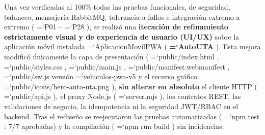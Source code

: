 \documentclass[11pt,a4paper]{article}
\renewcommand{\_}{\oldunderscore\allowbreak}
\DeclareRobustCommand{\texttt}[1]{%
  {\upshape\ttfamily\fontsize{9}{10.8}\selectfont\hyphenchar\font=`\-\relax #1}%
}
\begin{document}
\noindent Una vez verificadas al 100\% todas las pruebas funcionales, de seguridad, balanceo, mensajería RabbitMQ, tolerancia a fallos e integración extremo a extremo (\texttt{P01}--\texttt{P28}), se realizó una \textbf{iteración de refinamiento estrictamente visual y de experiencia de usuario (UI/UX)} sobre la aplicación móvil instalada \texttt{AplicacionMovilPWA} (\textbf{\texttt{AutoUTA}}). Esta mejora modificó únicamente la capa de presentación (\texttt{public/\allowbreak{}index.\allowbreak{}html}, \texttt{public/\allowbreak{}styles.\allowbreak{}css}, \texttt{public/\allowbreak{}main.\allowbreak{}js}, \texttt{public/\allowbreak{}manifest.\allowbreak{}webmanifest}, \texttt{public/\allowbreak{}sw.\allowbreak{}js} versión \texttt{vehiculos-pwa-v5} y el recurso gráfico \texttt{public/\allowbreak{}icons/\allowbreak{}hero-auto-uta.\allowbreak{}png}), \textbf{sin alterar en absoluto} el cliente HTTP (\texttt{public/\allowbreak{}api.\allowbreak{}js}), el proxy Node.js (\texttt{server.mjs}), los contratos REST, las validaciones de negocio, la idempotencia ni la seguridad JWT/RBAC en el backend. Tras el rediseño se reejecutaron las pruebas automatizadas (\texttt{npm test}: 7/7 aprobadas) y la compilación (\texttt{npm run build}) sin incidencias:
\end{document}
